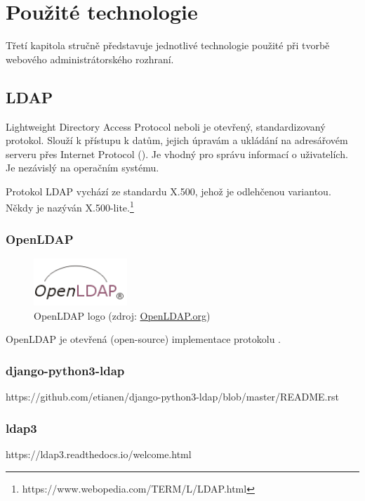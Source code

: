 \chapter{Použité technologie}
\label{3-technologie}

Třetí kapitola stručně představuje jednotlivé technologie použité při
tvorbě webového administrátorského rozhraní.

\section{LDAP}

Lightweight Directory Access Protocol neboli  je otevřený, standardizovaný protokol. Slouží k přístupu k datům, jejich úpravám a ukládání na adresářovém serveru přes Internet Protocol (). Je vhodný pro správu informací o uživatelích. Je nezávislý na operačním systému.

Protokol LDAP vychází ze standardu X.500, jehož je odlehčenou variantou. Někdy je nazýván X.500-lite.\footnote{https://www.webopedia.com/TERM/L/LDAP.html}

\subsection{OpenLDAP}

\begin{figure}[H] \centering
      \includegraphics[width=100pt]{./pictures/LDAPlogo.png}
      \caption[OpenLDAP logo]{OpenLDAP logo (zdroj:
\href{http://www.openldap.org/images/headers/LDAPlogo.gif}{OpenLDAP.org})}
      \label{fig:ldap}
  \end{figure}

OpenLDAP je otevřená (open-source) implementace protokolu .

\subsection{django-python3-ldap}
https://github.com/etianen/django-python3-ldap/blob/master/README.rst

\subsection{ldap3}
https://ldap3.readthedocs.io/welcome.html


